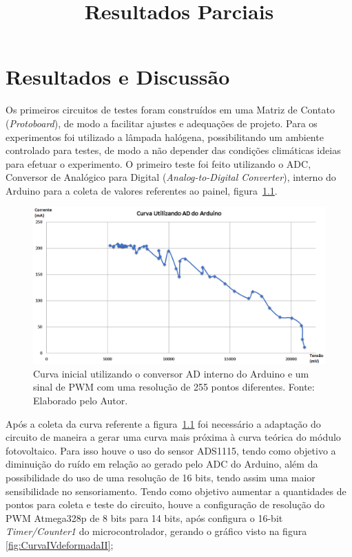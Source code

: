 \chapter{Resultados e Discussão}
\label{cap:04}

\title{Resultados Parciais}

Os primeiros circuitos de testes foram construídos em uma Matriz de Contato (\textit{Protoboard}), de modo a facilitar ajustes e adequações de projeto. Para os experimentos foi utilizado a lâmpada halógena, possibilitando um ambiente controlado para testes, de modo a não depender das condições climáticas ideias para efetuar o experimento. 
O primeiro teste foi feito utilizando o ADC, Conversor de Analógico para Digital (\textit{Analog-to-Digital Converter}), interno do Arduino para a coleta de valores referentes ao painel, figura~\ref{fig:CurvaArduino}.

\FloatBarrier
\begin{figure}[!htbp]
	\centering
	\includegraphics[scale=0.5]{imagens/CurvaArduino}
	\caption{Curva inicial utilizando o conversor AD interno do Arduino e um sinal de PWM com uma resolução de 255 pontos diferentes. Fonte: Elaborado pelo Autor. 	}
	\label{fig:CurvaArduino}
\end{figure}
\FloatBarrier

Após a coleta da curva referente a figura~\ref{fig:CurvaArduino} foi necessário a adaptação do circuito de maneira a gerar uma curva mais próxima à curva teórica do módulo fotovoltaico. Para isso houve o uso do sensor ADS1115, tendo como objetivo a diminuição do ruído em relação ao gerado pelo ADC do Arduino, além da possibilidade do uso de uma resolução de 16 bits, tendo assim uma maior sensibilidade no sensoriamento. Tendo como objetivo aumentar a quantidades de pontos para coleta e teste do circuito, houve a configuração de resolução do PWM Atmega328p de 8 bits para 14 bits, após configura o 16-bit \textit{Timer/Counter1} do microcontrolador, gerando o gráfico visto na figura \ref{fig:CurvaIVdeformadaII};

